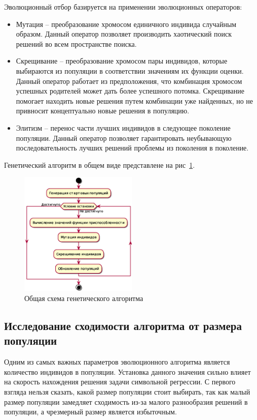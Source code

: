 Эволюционный отбор базируется на применении эволюционных операторов:
\begin{itemize}
\item Мутация -- преобразование хромосом единичного индивида случайным образом. Данный оператор позволяет производить хаотический поиск решений во всем пространстве поиска.
\item Скрещивание -- преобразование хромосом пары индивидов, которые выбираются из популяции в соответствии значениям их функции оценки. Данный оператор работает из предположения, что комбинация хромосом успешных родителей может дать более успешного потомка. Скрещивание помогает находить новые решения путем комбинации уже найденных, но не привносит концептуально новые решения в популяцию.
\item Элитизм -- перенос части лучших индивидов в следующее поколение популяции. Данный оператор позволяет гарантировать неубывающую последовательность лучших решений проблемы из поколения в поколение.
\end{itemize}

Генетический алгоритм в общем виде представлене на рис~\ref{figure:genetics}.

\begin{figure}[h!]
\centering
\includegraphics[width=0.5\textwidth]{science/genetic}
\caption{Общая схема генетического алгоритма}
\label{figure:genetics}
\end{figure}

\subsection{Исследование сходимости алгоритма от размера популяции}

Одним из самых важных параметров эволюционного алгоритма является количество индивидов в популяции. Установка данного значения сильно влияет на скорость нахождения решения задачи символьной регрессии. С первого взгляда нельзя сказать, какой размер популяции стоит выбирать, так как малый размер популяции замедляет сходимость из-за малого разнообразия решений в популяции, а чрезмерный размер является избыточным. 

